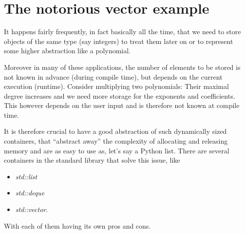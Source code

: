 \documentclass[onecolumn,11pt,oneside]{article}
\begin{document}
\section{The notorious vector example}

    It happens fairly frequently, in fact basically all the time, that we need to
    store objects of the same type (say integers) to treat them later on or to
    represent some higher abstraction like a polynomial.

    Moreover in many of these applications, the number of elements to be stored
    is not known in advance (during compile time), but depends on the current
    execution (runtime). Consider multiplying two polynomials: Their maximal degree
    increases and we need more storage for the exponents and coefficients.
    This however depends on the user input and is therefore not known at compile time.

    It is therefore crucial to have a good abstraction of such dynamically sized
    containers, that ``abstract away'' the complexity of allocating and releasing
    memory and are as easy to use as, let's say a Python list.
    There are several containers in the standard library that solve this
    issue, like
        \begin{itemize}
            \item \textit{std::list}
            \item \textit{std::deque}
            \item \textit{std::vector}.
        \end{itemize}
    With each of them having its own pros and cons.
\end{document}
